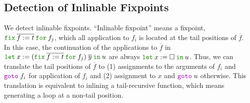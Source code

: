 \documentclass[a4paper,fleqn]{article}
\newcommand{\kwlet}{\mbox{\color{mygreen}\ttfamily let}}
\newcommand{\kwin}{\mbox{\color{mygreen}\ttfamily in}}
\newcommand{\kwfix}{\mbox{\color{mygreen}\ttfamily fix}}
\newcommand{\kwfor}{\mbox{\color{mygreen}\ttfamily for}}
\newcommand{\letin}[3]{\kwlet\:#1:=#2\:\kwin\:#3}
\newcommand{\ofix}[2]{\kwfix\:{#1}\:\kwfor\:{#2}}
\newcommand{\kwgoto}{\mbox{\color{myviolet}\ttfamily goto}}
\newcommand{\rep}[1]{\overline{#1}}
\begin{document}
\subsection{Detection of Inlinable Fixpoints}\label{sec:inlinable-fixpoint-detection}
We detect inlinable fixpoints.
``Inlinable fixpoint'' means a fixpoint, $\ofix{\rep{f:=t}}{f_j}$,
which all application to $f_i$ is located at the tail positions of $\rep{f}$.
In this case, the continuation of the applications to $\rep{f}$
in $\letin{x}{(\ofix{\rep{f:=t}}{f_j})\;\rep{y}}{u}$
are always $\letin{x}{\Box}{u}$.
Thus, we can translate the tail positions of $\rep{f}$ to
(1) assignments to the arguments of $f_i$ and $\kwgoto{}\;f_i$ for application of $f_i$ and
(2) assignment to $x$ and $\kwgoto{}\;u$ otherwise.
This translation is equivalent to inlining a tail-recursive function, which means generating a loop at a non-tail position.
\end{document}
